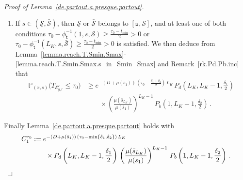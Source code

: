 \documentclass[AHL,Unicode,longabstracts,published]{cedram}
\newcommand{\PP}{\mathbb{P}}
\newcommand{\clE}{\mathcal{E}}
\newcommand{\clS}{\mathcal{S}}
\newcommand{\Smin}{\underline{\mathcal{S}}}
\newcommand{\Smax}{\bar{\mathcal{S}}}
\newcommand{\barmu}{\mu(\bar s_1)}
\newcommand{\phit}{\phi_\textsf{t}^{-1}}
\newcommand{\lmax}{{L_K}}
\newcommand{\1}{\mathbf{1}}
\begin{document}
\begin{proof}[Proof of Lemma~\ref{de.partout.a.presque.partout}]
\begin{enumerate}
\item If $s\in (\Smin, \Smax)$, then $\Smin$ or $\Smax$ belongs to $[\texttt{s},\clS]$, and at least one of both conditions $\tau_0-\phit\left(1,s,\Smin\right)
\geq \frac{\tau_0-t_{\min}}{2} >0 $ or $
\tau_0-\phit\left(\lmax,s,\Smax\right)
\geq\frac{\tau_0-t_{\min}}{2}>0 $ is satisfied. We then deduce from Lemma~\ref{lemma.reach.T.Smin.Smax}-\ref{lemma.reach.T.Smin.Smax.s_in_Smin_Smax} and Remark~\ref{rk.Pd.Pb.inc} that
\begin{align*}
\PP_{(x,s)}\big(T_{\clE_{y,r}^\varepsilon}\leq \tau_0\big) &\geq e^{-(D+\barmu)\,\left(\tau_0-\frac{\delta_1+\delta_2}{2}\right)\,\lmax}\, P_d\left(\lmax,\lmax-1, \frac{\delta_1}{2}\right)\,
\\
&\qquad \times
\left(\frac{\mu(\bar s_{\lmax})}{\barmu}\right)^{\lmax-1}\,P_b\left(1,\lmax-1, \frac{\delta_2}{2}\right)\,.
\end{align*}
\end{enumerate}
Finally Lemma~\ref{de.partout.a.presque.partout} holds with
\begin{align*}
C_1^{\tau_0}&:= e^{-(D+\barmu)\,(\tau_0-\min\{\delta_1,\delta_2\})\,\lmax}\\
& \qquad
\times P_d\left(\lmax,\lmax-1, \frac{\delta_1}{2}\right)\,
\left(\frac{\mu(\bar s_{\lmax})}{\barmu}\right)^{\lmax-1}\,P_b\left(1,\lmax-1, \frac{\delta_2}{2}\right)\,.
\qedhere
\end{align*}
\end{proof}
\end{document}
